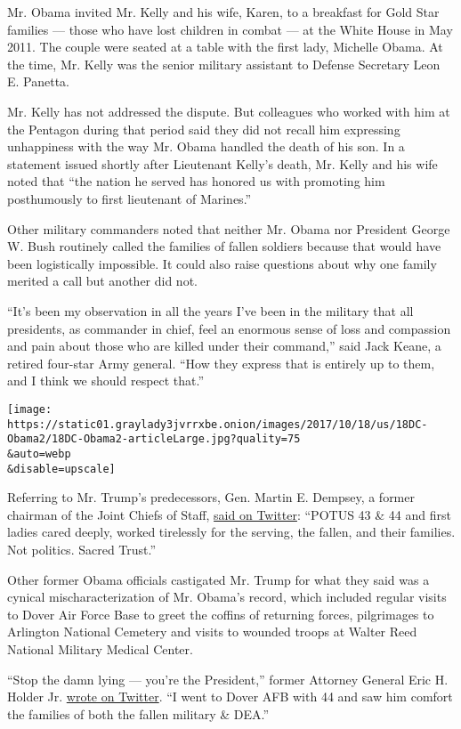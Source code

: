 Mr. Obama invited Mr. Kelly and his wife, Karen, to a breakfast for Gold
Star families --- those who have lost children in combat --- at the
White House in May 2011. The couple were seated at a table with the
first lady, Michelle Obama. At the time, Mr. Kelly was the senior
military assistant to Defense Secretary Leon E. Panetta.

Mr. Kelly has not addressed the dispute. But colleagues who worked with
him at the Pentagon during that period said they did not recall him
expressing unhappiness with the way Mr. Obama handled the death of his
son. In a statement issued shortly after Lieutenant Kelly's death, Mr.
Kelly and his wife noted that ``the nation he served has honored us with
promoting him posthumously to first lieutenant of Marines.''

Other military commanders noted that neither Mr. Obama nor President
George W. Bush routinely called the families of fallen soldiers because
that would have been logistically impossible. It could also raise
questions about why one family merited a call but another did not.

``It's been my observation in all the years I've been in the military
that all presidents, as commander in chief, feel an enormous sense of
loss and compassion and pain about those who are killed under their
command,'' said Jack Keane, a retired four-star Army general. ``How they
express that is entirely up to them, and I think we should respect
that.''

\texttt{[image: https://static01.graylady3jvrrxbe.onion/images/2017/10/18/us/18DC-Obama2/18DC-Obama2-articleLarge.jpg?quality=75\\\&auto=webp\\\&disable=upscale]}

Referring to Mr. Trump's predecessors, Gen. Martin E. Dempsey, a former
chairman of the Joint Chiefs of Staff,
\href{https://twitter.com/Martin_Dempsey/status/920105739489816576}{said
on Twitter}: ``POTUS 43 \& 44 and first ladies cared deeply, worked
tirelessly for the serving, the fallen, and their families. Not
politics. Sacred Trust.''

Other former Obama officials castigated Mr. Trump for what they said was
a cynical mischaracterization of Mr. Obama's record, which included
regular visits to Dover Air Force Base to greet the coffins of returning
forces, pilgrimages to Arlington National Cemetery and visits to wounded
troops at Walter Reed National Military Medical Center.

``Stop the damn lying --- you're the President,'' former Attorney
General Eric H. Holder Jr.
\href{https://twitter.com/EricHolder/status/920130744059662336}{wrote on
Twitter}. ``I went to Dover AFB with 44 and saw him comfort the families
of both the fallen military \& DEA.''

